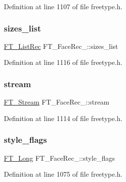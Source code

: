 Definition at line 1107 of file freetype.\+h.

\mbox{\label{struct_f_t___face_rec___a47504203e02bfba59c802c35cb4009ed}} 
\subsubsection{\texorpdfstring{sizes\_list}{sizes\_list}}
{\footnotesize\ttfamily \mbox{\hyperlink{fttypes_8h_ac01ed10278dab3cb3f046dba687b50ed}{F\+T\+\_\+\+List\+Rec}} F\+T\+\_\+\+Face\+Rec\+\_\+\+::sizes\+\_\+list}



Definition at line 1116 of file freetype.\+h.

\mbox{\label{struct_f_t___face_rec___a831d5da25cd0fe2a783d2a73f467de55}} 
\subsubsection{\texorpdfstring{stream}{stream}}
{\footnotesize\ttfamily \mbox{\hyperlink{ftsystem_8h_a788b32c932932f7411a8dfa7f6c794bf}{F\+T\+\_\+\+Stream}} F\+T\+\_\+\+Face\+Rec\+\_\+\+::stream}



Definition at line 1114 of file freetype.\+h.

\mbox{\label{struct_f_t___face_rec___ab06fc56f19fc1bf51cbed9bd621d3835}} 
\subsubsection{\texorpdfstring{style\_flags}{style\_flags}}
{\footnotesize\ttfamily \mbox{\hyperlink{fttypes_8h_a7fa72a1f0e79fb1860c5965789024d6f}{F\+T\+\_\+\+Long}} F\+T\+\_\+\+Face\+Rec\+\_\+\+::style\+\_\+flags}



Definition at line 1075 of file freetype.\+h.

\mbox{\label{struct_f_t___face_rec___abd855b9e48b1f377b22176fb97668d7b}} 
